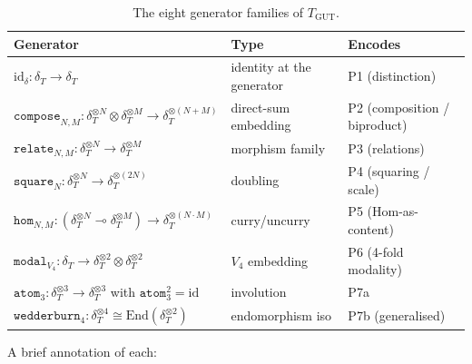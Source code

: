 \documentclass[11pt,a4paper]{article}
\theoremstyle{plain}
\theoremstyle{definition}
\theoremstyle{remark}
\newcommand{\End}{\mathrm{End}}
\newcommand{\id}{\mathrm{id}}
\newcommand{\TGUT}{T_{\mathrm{GUT}}}
\begin{document}
\begin{table}[h!]
\centering
\small
\begin{tabular}{lll}
\toprule
Generator & Type & Encodes \\
\midrule
$\id_\delta : \delta_T \to \delta_T$ & identity at the generator & P1 (distinction) \\
$\mathtt{compose}_{N,M} : \delta_T^{\otimes N} \otimes \delta_T^{\otimes M} \to \delta_T^{\otimes(N+M)}$ & direct-sum embedding & P2 (composition / biproduct) \\
$\mathtt{relate}_{N,M} : \delta_T^{\otimes N} \to \delta_T^{\otimes M}$ & morphism family & P3 (relations) \\
$\mathtt{square}_N : \delta_T^{\otimes N} \to \delta_T^{\otimes(2N)}$ & doubling & P4 (squaring / scale) \\
$\mathtt{hom}_{N,M} : (\delta_T^{\otimes N} \multimap \delta_T^{\otimes M}) \to \delta_T^{\otimes(N\cdot M)}$ & curry/uncurry & P5 (Hom-as-content) \\
$\mathtt{modal}_{V_4} : \delta_T \to \delta_T^{\otimes 2} \otimes \delta_T^{\otimes 2}$ & $V_4$ embedding & P6 (4-fold modality) \\
$\mathtt{atom}_3 : \delta_T^{\otimes 3} \to \delta_T^{\otimes 3}$ with $\mathtt{atom}_3^2 = \id$ & involution & P7a \\
$\mathtt{wedderburn}_4 : \delta_T^{\otimes 4} \cong \End(\delta_T^{\otimes 2})$ & endomorphism iso & P7b (generalised) \\
\bottomrule
\end{tabular}
\caption{The eight generator families of $\TGUT$.}\label{tab:generators}
\end{table}

A brief annotation of each:
\end{document}
